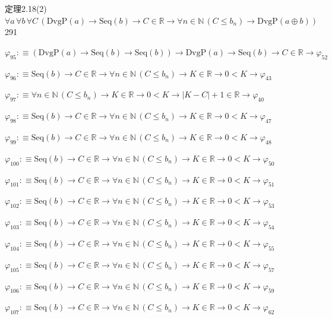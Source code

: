 \begin{fullproof}{定理2.18(2)}{$\forall a\,\forall b\,\forall C\,(\mathrm{DvgP}(a) \to \mathrm{Seq}(b) \to C \in \mathbb{R} \to \forall n \in \mathbb{N}\,(C \leq b_{n}) \to \mathrm{DvgP}(a \oplus b))$}{291}
\begin{abbrevlist}
\item $\varphi_{95} :\equiv (\mathrm{DvgP}(a) \to \mathrm{Seq}(b) \to \mathrm{Seq}(b)) \to \mathrm{DvgP}(a) \to \mathrm{Seq}(b) \to C \in \mathbb{R} \to \varphi_{52}$
\item $\varphi_{96} :\equiv \mathrm{Seq}(b) \to C \in \mathbb{R} \to \forall n \in \mathbb{N}\,(C \leq b_{n}) \to K \in \mathbb{R} \to 0 < K \to \varphi_{43}$
\item $\varphi_{97} :\equiv \forall n \in \mathbb{N}\,(C \leq b_{n}) \to K \in \mathbb{R} \to 0 < K \to \lvert K - C \rvert + 1 \in \mathbb{R} \to \varphi_{40}$
\item $\varphi_{98} :\equiv \mathrm{Seq}(b) \to C \in \mathbb{R} \to \forall n \in \mathbb{N}\,(C \leq b_{n}) \to K \in \mathbb{R} \to 0 < K \to \varphi_{47}$
\item $\varphi_{99} :\equiv \mathrm{Seq}(b) \to C \in \mathbb{R} \to \forall n \in \mathbb{N}\,(C \leq b_{n}) \to K \in \mathbb{R} \to 0 < K \to \varphi_{48}$
\item $\varphi_{100} :\equiv \mathrm{Seq}(b) \to C \in \mathbb{R} \to \forall n \in \mathbb{N}\,(C \leq b_{n}) \to K \in \mathbb{R} \to 0 < K \to \varphi_{50}$
\item $\varphi_{101} :\equiv \mathrm{Seq}(b) \to C \in \mathbb{R} \to \forall n \in \mathbb{N}\,(C \leq b_{n}) \to K \in \mathbb{R} \to 0 < K \to \varphi_{51}$
\item $\varphi_{102} :\equiv \mathrm{Seq}(b) \to C \in \mathbb{R} \to \forall n \in \mathbb{N}\,(C \leq b_{n}) \to K \in \mathbb{R} \to 0 < K \to \varphi_{53}$
\item $\varphi_{103} :\equiv \mathrm{Seq}(b) \to C \in \mathbb{R} \to \forall n \in \mathbb{N}\,(C \leq b_{n}) \to K \in \mathbb{R} \to 0 < K \to \varphi_{54}$
\item $\varphi_{104} :\equiv \mathrm{Seq}(b) \to C \in \mathbb{R} \to \forall n \in \mathbb{N}\,(C \leq b_{n}) \to K \in \mathbb{R} \to 0 < K \to \varphi_{55}$
\item $\varphi_{105} :\equiv \mathrm{Seq}(b) \to C \in \mathbb{R} \to \forall n \in \mathbb{N}\,(C \leq b_{n}) \to K \in \mathbb{R} \to 0 < K \to \varphi_{57}$
\item $\varphi_{106} :\equiv \mathrm{Seq}(b) \to C \in \mathbb{R} \to \forall n \in \mathbb{N}\,(C \leq b_{n}) \to K \in \mathbb{R} \to 0 < K \to \varphi_{59}$
\item $\varphi_{107} :\equiv \mathrm{Seq}(b) \to C \in \mathbb{R} \to \forall n \in \mathbb{N}\,(C \leq b_{n}) \to K \in \mathbb{R} \to 0 < K \to \varphi_{62}$

\end{abbrevlist}
\end{fullproof}
